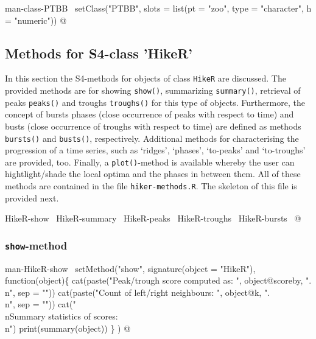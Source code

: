 \documentclass[a4paper]{article}
\begin{document}
\LA{}man-class-PTBB~{\nwtagstyle{}}\RA{}
setClass("PTBB", slots = list(pt = "zoo",
                              type = "character",
                              h = "numeric"))
\nwendcode{}@

\subsection{Methods for S4-class 'HikeR'}

In this section the S4-methods for objects of class \verb?HikeR? are
discussed. The provided methods are for showing \verb?show()?,
summarizing \verb?summary()?, retrieval of peaks \verb?peaks()? and troughs
\verb?troughs()? for this type of objects. Furthermore, the concept of
bursts phases (close occurrence of peaks with respect to time) and
busts (close occurrence of troughs with respect to time) are defined
as methods \verb?bursts()? and \verb?busts()?, respectively. Additional
methods for characterising the progression of a time series, such as
`ridges', `phases', `to-peaks' and `to-troughs' are provided,
too. Finally, a \verb?plot()?-method is available whereby the user can
hightlight/shade the local optima and the phases in between them. All
of these methods are contained in the file \verb?hiker-methods.R?. The
skeleton of this file is provided next.

\nwenddocs{}\endmoddef\let\nwnotused=\nwoutput{}
\LA{}HikeR-show~{\nwtagstyle{}}\RA{}
\LA{}HikeR-summary~{\nwtagstyle{}}\RA{}
\LA{}HikeR-peaks~{\nwtagstyle{}}\RA{}
\LA{}HikeR-troughs~{\nwtagstyle{}}\RA{}
\LA{}HikeR-bursts~{\nwtagstyle{}}\RA{}
\nwnotused{HikerMethods.R}\nwendcode{}@


\subsubsection{\texttt{show}-method}

\nwenddocs{}\endmoddef
\LA{}man-HikeR-show~{\nwtagstyle{}}\RA{}
setMethod("show",
          signature(object = "HikeR"), function(object)\{
              cat(paste("Peak/trough score computed as: ",
                        object@scoreby, ".\\n", sep = ""))
              cat(paste("Count of left/right neighbours: ", object@k,
                        ".\\n", sep = ""))
              cat("\\nSummary statistics of scores:\\n")
              print(summary(object))
          \}
)
\nwendcode{}@
\end{document}
